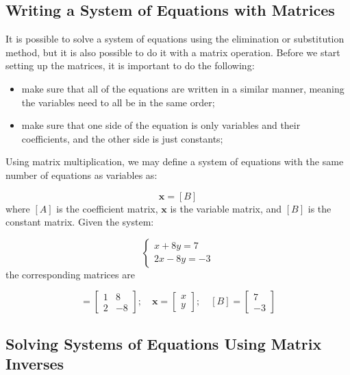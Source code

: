 \subsection{Writing a System of Equations with Matrices}
\label{writing-a-system-of-equations-with-matrices}

It is possible to solve a system of equations using the elimination or substitution method, but it is also possible to do it with a matrix
operation. Before we start setting up the matrices, it is important to do the following:

\begin{itemize}
\tightlist
\item make sure that all of the equations are written in a similar manner, meaning the variables need to all be in the same order;
\item make sure that one side of the equation is only variables and their coefficients, and the other side is just constants;
\end{itemize}

Using matrix multiplication, we may define a system of equations with the same number of equations as variables as:

\begin{equation} 
[A]\boldsymbol{x} = [B]
\end{equation}
where $[A]$ is the coefficient matrix, $\boldsymbol{x}$ is the variable matrix, and $[B]$ is the constant matrix. Given the system:

\begin{equation*}
\begin{cases}
x + 8y = 7 \\
2x -8y = -3
\end{cases}
\end{equation*}
the corresponding matrices are

\begin{equation*}
[A]=
\begin{bmatrix}
1 & 8\\
2 & -8
\end{bmatrix}
;\quad
\boldsymbol{x}=
\begin{bmatrix}
x\\
y
\end{bmatrix}
;\quad
[B]=
\begin{bmatrix}
7\\
-3
\end{bmatrix}
\end{equation*}

\subsection{Solving Systems of Equations Using Matrix Inverses}
\label{solving-systems-of-equations-using-matrix-inverses}

